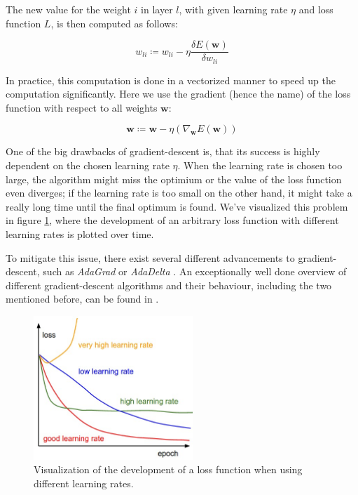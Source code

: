 The new value for the weight $i$ in layer $l$, with given learning rate $\eta$ and loss function $L$, is then computed as follows:

\begin{equation}
\label{fundamentals:equation:gradient_descent}
w_{li} \coloneqq w_{li} - \eta \frac{\delta E(\mathbf{w})}{\delta w_{li}}
\end{equation}

In practice, this computation is done in a vectorized manner to speed up the computation significantly. Here we use the gradient (hence the name) of the loss function with respect to all weights $\mathbf{w}$:

\begin{equation}
\mathbf{w} \coloneqq \mathbf{w} - \eta(\nabla_{\mathbf{w}}E(\mathbf{w}))
\end{equation}

One of the big drawbacks of gradient-descent is, that its success is highly dependent on the chosen learning rate $\eta$. When the learning rate is chosen too large, the algorithm might miss the optimium or the value of the loss function even diverges; if the learning rate is too small on the other hand, it might take a really long time until the final optimum is found. We've visualized this problem in figure \ref{fundamentals:figures:learning_rates}, where the development of an arbitrary loss function with different learning rates is plotted over time.

To mitigate this issue, there exist several different advancements to gradient-descent, such as \emph{AdaGrad} \cite{Duchi:2011} or \emph{AdaDelta} \cite{Zeile:2012}. An exceptionally well done overview of different gradient-descent algorithms and their behaviour, including the two mentioned before, can be found in \cite{Ruder:2016}.

\begin{figure}[h]
	\centering
	\includegraphics[width=6cm]{img/learning_rates_comparison}
	\caption{Visualization of the development of a loss function when using different learning rates.\protect\footnotemark}
	\label{fundamentals:figures:learning_rates}
\end{figure}
